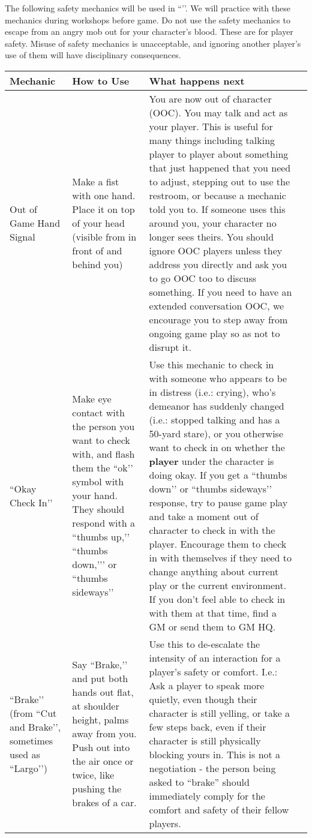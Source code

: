 \documentclass[sheet]{GL2020}
\begin{document}
The following safety mechanics will be used in ``\gamename{}’’. We will practice with these mechanics during workshops before game. Do not use the safety mechanics to escape from an angry mob out for your character’s blood. These are for player safety. Misuse of safety mechanics is unacceptable, and ignoring another player’s use of them will have disciplinary consequences.

\begin{tabularx}{\textwidth}{|>{\centering\arraybackslash} m{1.5cm} | >{\centering\arraybackslash} m{1.8cm} | >{\centering\arraybackslash} m{1.8cm} | >{\centering\arraybackslash}X |}
\hline 
 \textbf{Mechanic} & \textbf{How to Use} & \textbf{What happens next} \\
\hline
Out of Game Hand Signal & Make a fist with one hand. Place it on top of your head (visible from in front of and behind you) & You are now out of character (OOC). You may talk and act as your player. This is useful for many things including talking player to player about something that just happened that you need to adjust, stepping out to use the restroom, or because a mechanic told you to. If someone uses this around you, your character no longer sees theirs. You should ignore OOC players unless they address you directly and ask you to go OOC too to discuss something. If you need to have an extended conversation OOC, we encourage you to step away from ongoing game play so as not to disrupt it. \\
    \hline
``Okay Check In’’ & Make eye contact with the person you want to check with, and flash them the ``ok’’ symbol with your hand. They should respond with a ``thumbs up,’’ ``thumbs down,’’’ or ``thumbs sideways’’ & Use this mechanic to check in with someone who appears to be in distress (i.e.: crying), who’s demeanor has suddenly changed (i.e.: stopped talking and has a 50-yard stare), or you otherwise want to check in on whether the \textbf{player} under the character is doing okay. If you get a ``thumbs down’’ or ``thumbs sideways’’ response, try to pause game play and take a moment out of character to check in with the player. Encourage them to check in with themselves if they need to change anything about current play or the current environment. If you don’t feel able to check in with them at that time, find a GM or send them to GM HQ.\\
    \hline
``Brake’’ (from ``Cut and Brake’’, sometimes used as ``Largo’’) & Say ``Brake,’’ and put both hands out flat, at shoulder height, palms away from you. Push out into the air once or twice, like pushing the brakes of a car. & Use this to de-escalate the intensity of an interaction for a player’s safety or comfort. I.e.: Ask a player to speak more quietly, even though their character is still yelling, or take a few steps back, even if their character is still physically blocking yours in. This is not a negotiation - the person being asked to ``brake'' should immediately comply for the comfort and safety of their fellow players. \\

\end{tabularx}
\end{document}
